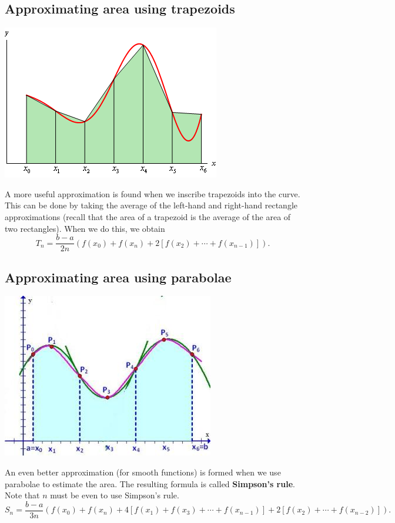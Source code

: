 \subsection*{Approximating area using trapezoids}
\begin{center}
  \includegraphics[width=0.4\linewidth]{approx-trapezoids}
\end{center}
A more useful approximation is found when we inscribe trapezoids into the curve. This can be done by taking
the average of the left-hand and right-hand rectangle approximations (recall that the area of a trapezoid is
the average of the area of two rectangles). When we do this, we obtain
\begin{displaymath}
  T_n = \frac{b - a}{2n} \left( f(x_0) + f(x_n) + 2\left[f(x_2) + \cdots + f(x_{n - 1})\right] \right).
\end{displaymath}

\subsection*{Approximating area using parabolae}
\begin{center}
  \includegraphics[width=0.4\linewidth]{approx-parabolae}
\end{center}
An even better approximation (for smooth functions) is formed when we use parabolae to estimate the area. The
resulting formula is called \textbf{Simpson's rule}. Note that $ n $ must be even to use Simpson's rule.
\begin{displaymath}
  S_n = \frac{b - a}{3n} \left( f(x_0) + f(x_n) + 4\left[f(x_1) + f(x_3) + \cdots + f(x_{n - 1})\right] + 2\left[ f(x_2) + \cdots + f(x_{n - 2}) \right] \right).
\end{displaymath}

